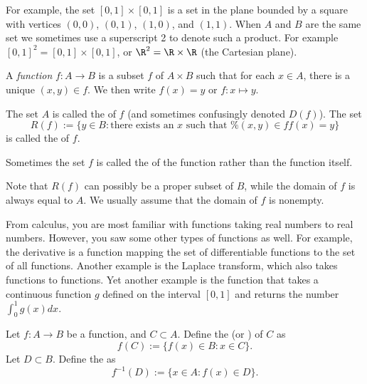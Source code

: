 \documentclass[12pt]{book}
\begin{document}
For example, the set $[0,1] \times [0,1]$ is a set in the plane
bounded by a square with vertices $(0,0)$, $(0,1)$, $(1,0)$, and $(1,1)$.
When $A$ and $B$ are the same set we sometimes use a superscript 2 to denote
such a product.
For example $[0,1]^2 = 
[0,1] \times [0,1]$, or $\R^2 = \R \times \R$ (the Cartesian plane).

\begin{defn}
A \emph{function} $f \colon A \to B$ is a subset $f$ of $A \times B$
such that for each $x \in A$, there is a unique $(x,y) \in f$.
We then
write $f(x) = y$ or $f\colon x\mapsto y$.  

The set $A$ is called the \emph{} of $f$ (and
sometimes confusingly denoted $D(f)$).
The set
\begin{equation*}
R(f) := \{ y \in B : \text{there exists an $x$ such that
$f(x)=y$
} \}
\end{equation*}
is called the \emph{} of $f$.
\end{defn}

Sometimes
the set $f$ is called the \emph{} of the function rather than
the function itself.

Note that $R(f)$ can possibly be a proper subset of $B$,
while the domain of $f$ is always equal to $A$.
We usually 
assume that the domain of $f$ is nonempty.

\begin{example}
From calculus, you are most familiar with functions taking real numbers to real
numbers.
However, you saw some other types of functions as well.
For
example, the derivative is a function mapping the set of
differentiable functions to the set of all functions.
Another example is the Laplace transform, which also
takes functions to functions.
Yet another example is the function that takes
a continuous function $g$ defined on the interval $[0,1]$ and returns the
number $\int_0^1 g(x) dx$.
\end{example}

\begin{defn}
Let $f \colon A \to B$ be a function, and $C \subset A$.
Define
the \emph{} (or \emph{}) of $C$ as
\begin{equation*}
f(C) := \{ f(x) \in B : x \in C \} .
\end{equation*}
Let $D \subset B$.
Define the \emph{} as
\begin{equation*}
f^{-1}(D) := \{ x \in A : f(x) \in D \} .
\end{equation*}
\end{defn}
\end{document}
